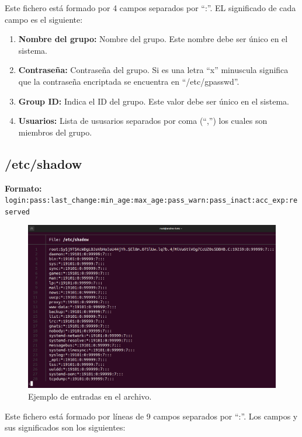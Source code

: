 \documentclass{article}
\begin{document}
\bigskip

Este fichero está formado por 4 campos separados por ``:''. EL significado de cada campo es el siguiente:

\begin{enumerate}
    \item \textbf{Nombre del grupo: }Nombre del grupo. Este nombre debe ser único en el sistema.
    
    \item \textbf{Contraseña: }Contraseña del grupo. Si es una letra ``x'' minuscula significa que la contraseña encriptada se encuentra en ``/etc/gpasswd''.
    \item \textbf{Group ID: }Indica el ID del grupo. Este valor debe ser único en el sistema.
    \item \textbf{Usuarios: }Lista de ususarios separados por coma (``,'') los cuales son miembros del grupo. 
\end{enumerate}
\subsection{/etc/shadow}
\textbf{Formato: }\verb|login:pass:last_change:min_age:max_age:pass_warn:pass_inact:acc_exp:reserved|

\begin{figure}[H]
    \includegraphics[width=\textwidth]{imagenes/shadowfile.png}
    \caption{Ejemplo de entradas en el archivo.}    
\end{figure}

\bigskip

Este fichero está formado por líneas de 9 campos separados por ``:''. Los campos y sus significados son los siguientes:
\end{document}
